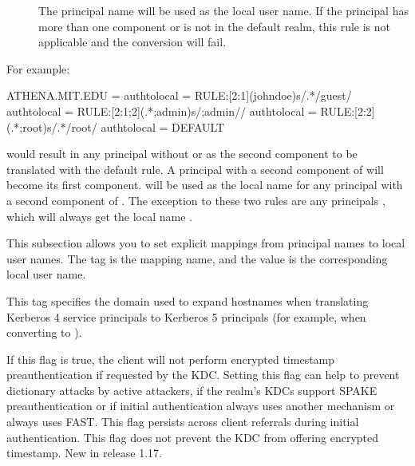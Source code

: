 \documentclass[letterpaper,10pt,english]{sphinxmanual}
\begin{document}
\begin{description}
\begin{description}
\item[{}] \leavevmode
The principal name will be used as the local user name.  If
the principal has more than one component or is not in the
default realm, this rule is not applicable and the conversion
will fail.

\end{description}

For example:

%
\begin{sphinxVerbatim}[commandchars=\\\{\}]
[realms]
    ATHENA.MIT.EDU = \PYGZob{}
        auth\PYGZus{}to\PYGZus{}local = RULE:[2:\PYGZdl{}1](johndoe)s/\PYGZca{}.*\PYGZdl{}/guest/
        auth\PYGZus{}to\PYGZus{}local = RULE:[2:\PYGZdl{}1;\PYGZdl{}2](\PYGZca{}.*;admin\PYGZdl{})s/;admin\PYGZdl{}//
        auth\PYGZus{}to\PYGZus{}local = RULE:[2:\PYGZdl{}2](\PYGZca{}.*;root)s/\PYGZca{}.*\PYGZdl{}/root/
        auth\PYGZus{}to\PYGZus{}local = DEFAULT
    \PYGZcb{}
\end{sphinxVerbatim}

would result in any principal without  or  as the
second component to be translated with the default rule.  A
principal with a second component of  will become its
first component.   will be used as the local name for any
principal with a second component of .  The exception to
these two rules are any principals , which will
always get the local name .

\item[{\sphinxstylestrong{auth\_to\_local\_names}}] \leavevmode
This subsection allows you to set explicit mappings from principal
names to local user names.  The tag is the mapping name, and the
value is the corresponding local user name.

\item[{\sphinxstylestrong{default\_domain}}] \leavevmode
This tag specifies the domain used to expand hostnames when
translating Kerberos 4 service principals to Kerberos 5 principals
(for example, when converting  to
).

\item[{\sphinxstylestrong{disable\_encrypted\_timestamp}}] \leavevmode
If this flag is true, the client will not perform encrypted
timestamp preauthentication if requested by the KDC.  Setting this
flag can help to prevent dictionary attacks by active attackers,
if the realm’s KDCs support SPAKE preauthentication or if initial
authentication always uses another mechanism or always uses FAST.
This flag persists across client referrals during initial
authentication.  This flag does not prevent the KDC from offering
encrypted timestamp.  New in release 1.17.


\end{description}
\end{document}
